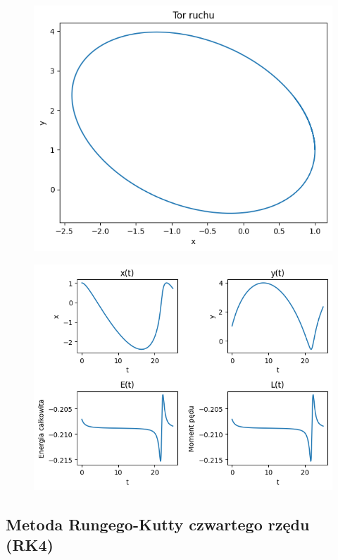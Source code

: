\documentclass{article}
\begin{document}
	
	\begin{figure}[h]
		\centering
		\includegraphics[scale = 0.5]{wykres5.png}
	\end{figure}

	\begin{figure}[h]
		\centering
		\includegraphics[scale = 0.70]{wykres6.png}
	\end{figure}

	\newpage

	\subsection*{Metoda Rungego-Kutty czwartego rzędu (RK4)}
\end{document}
